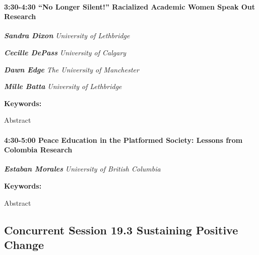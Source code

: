 \documentclass[
]{book}
\begin{document}
\begin{session}
\hypertarget{no-longer-silent-racialized-academic-women-speak-out-research}{%
\paragraph*{\texorpdfstring{3:30-4:30 \textbar{} \textbf{``No Longer
Silent!'' Racialized Academic Women Speak Out} \textbar{}
Research}{3:30-4:30 \textbar{} ``No Longer Silent!'' Racialized Academic Women Speak Out \textbar{} Research}}\label{no-longer-silent-racialized-academic-women-speak-out-research}}

\textbf{\emph{Sandra Dixon}} \textbar{} \emph{University of Lethbridge}

\textbf{\emph{Cecille DePass}} \textbar{} \emph{University of Calgary}

\textbf{\emph{Dawn Edge}} \textbar{} \emph{The University of Manchester}

\textbf{\emph{Mille Batta}} \textbar{} \emph{University of Lethbridge}

\textbf{Keywords:}

Abstract
\end{session}

\begin{session}
\hypertarget{peace-education-in-the-platformed-society-lessons-from-colombia-research}{%
\paragraph*{\texorpdfstring{4:30-5:00 \textbar{} \textbf{Peace Education
in the Platformed Society: Lessons from Colombia} \textbar{}
Research}{4:30-5:00 \textbar{} Peace Education in the Platformed Society: Lessons from Colombia \textbar{} Research}}\label{peace-education-in-the-platformed-society-lessons-from-colombia-research}}

\textbf{\emph{Estaban Morales}} \textbar{} \emph{University of British
Columbia}

\textbf{Keywords:}

Abstract
\end{session}

\hypertarget{concurrent-session-19.3-sustaining-positive-change}{%
\subsection*{Concurrent Session 19.3 \textbar{} Sustaining Positive Change}\label{concurrent-session-19.3-sustaining-positive-change}}
\end{document}
